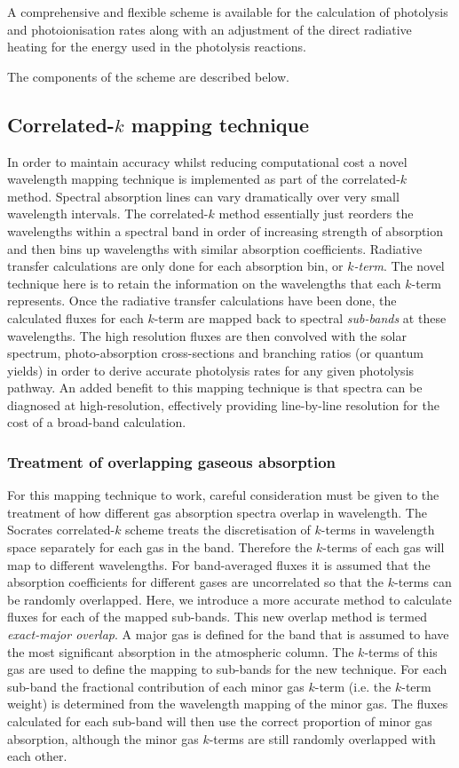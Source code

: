 A comprehensive and flexible scheme is available for the calculation of
photolysis and photoionisation rates along with an adjustment of the direct
radiative heating for the energy used in the photolysis reactions.

The components of the scheme are described below.

\subsection{Correlated-$k$ mapping technique}
In order to maintain accuracy whilst reducing computational cost a novel wavelength mapping technique
is implemented as part of the correlated-$k$ method. Spectral absorption lines can vary dramatically over
very small wavelength intervals. The correlated-$k$ method essentially just reorders the wavelengths within
a spectral band in order of increasing strength of absorption and then bins up wavelengths with similar absorption
coefficients. Radiative transfer calculations are only done for each absorption bin, or {\em $k$-term}.
The novel technique here is to retain the information on the wavelengths that each $k$-term represents.
Once the radiative transfer calculations have been done, the calculated fluxes for each $k$-term are mapped
back to spectral {\em sub-bands} at these wavelengths. The high resolution fluxes are then convolved with the solar spectrum,
photo-absorption cross-sections and branching ratios (or quantum yields) in order to derive accurate photolysis
rates for any given photolysis pathway.
An added benefit to this mapping technique is that spectra can be diagnosed at high-resolution, effectively
providing line-by-line resolution for the cost of a broad-band calculation.

\subsubsection{Treatment of overlapping gaseous absorption}
For this mapping technique to work, careful consideration must be given to the treatment of how different gas absorption spectra overlap in wavelength. The Socrates correlated-$k$ scheme treats the discretisation of $k$-terms in wavelength space separately for each gas in the band. Therefore the $k$-terms of each gas will map to different wavelengths. For band-averaged fluxes it is assumed that the absorption coefficients for different gases are uncorrelated so that the $k$-terms can be randomly overlapped. Here, we introduce a more accurate method to calculate fluxes for each of the mapped sub-bands. This new overlap method is termed {\em exact-major overlap}. A major gas is defined for the band that is assumed to have the most significant absorption in the atmospheric column. The $k$-terms of this gas are used to define the mapping to sub-bands for the new technique. For each sub-band the fractional contribution of each minor gas $k$-term (i.e. the $k$-term weight) is determined from the wavelength mapping of the minor gas. The fluxes calculated for each sub-band will then use the correct proportion of minor gas absorption, although the minor gas $k$-terms are still randomly overlapped with each other.

